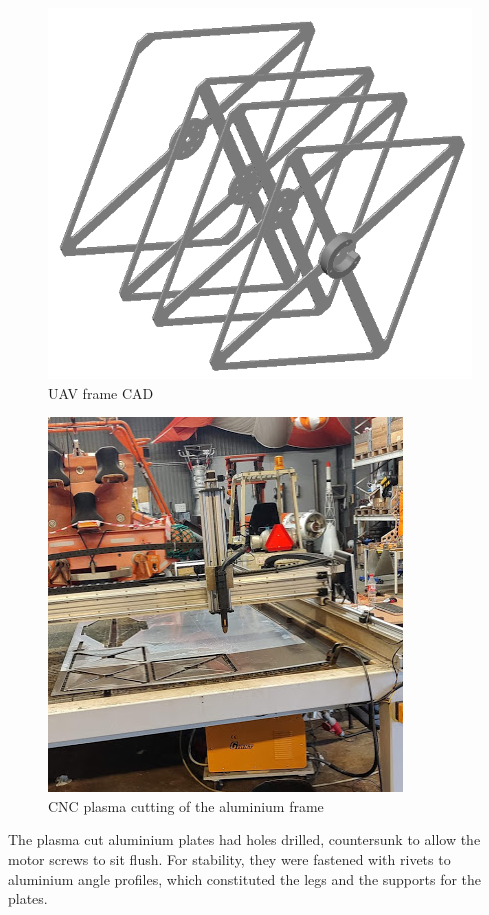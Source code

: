 \begin{figure}[h]
  \centering
  \includegraphics[scale=0.6]{graphics/droneCAD2.png}
  \caption{UAV frame CAD}
  \label{fig:CAD}
\end{figure}


\begin{figure}[h!]
  \centering
  \includegraphics[scale=0.9]{graphics/CNCmachine.png}
  \caption{CNC plasma cutting of the aluminium frame}
  \label{fig:CNC plasma cutting}
\end{figure}


The plasma cut aluminium plates had holes drilled, countersunk to allow the motor screws to sit flush. For stability, they were fastened with rivets to aluminium angle profiles, which constituted the legs and the supports for the plates.

